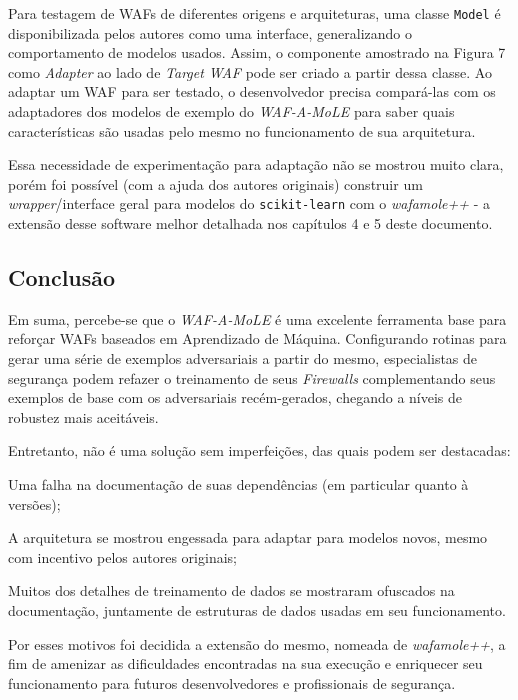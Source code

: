 \bigskip

Para testagem de WAFs de diferentes origens e arquiteturas, uma classe \verb+Model+ é disponibilizada pelos autores como uma interface, generalizando o comportamento de modelos usados. Assim, o componente amostrado na Figura 7 como \textit{Adapter} ao lado de \textit{Target WAF} pode ser criado a partir dessa classe. Ao adaptar um WAF para ser testado, o desenvolvedor precisa compará-las com os adaptadores dos modelos de exemplo do \textit{WAF-A-MoLE} para saber quais características são usadas pelo mesmo no funcionamento de sua arquitetura.


Essa necessidade de experimentação para adaptação não se mostrou muito clara, porém foi possível (com a ajuda dos autores originais) construir um \textit{wrapper}/interface geral para modelos do \verb+scikit-learn+ com o \textit{wafamole++} - a extensão desse software melhor detalhada nos capítulos 4 e 5 deste documento.

\subsection{Conclusão}
Em suma, percebe-se que o \textit{WAF-A-MoLE} é uma excelente ferramenta base para reforçar WAFs baseados em Aprendizado de Máquina. Configurando rotinas para gerar uma série de exemplos adversariais a partir do mesmo, especialistas de segurança podem refazer o treinamento de seus \textit{Firewalls} complementando seus exemplos de base com os adversariais recém-gerados, chegando a níveis de robustez mais aceitáveis. 

Entretanto, não é uma solução sem imperfeições, das quais podem ser destacadas:
\begin{alineas}
\item Uma falha na documentação de suas dependências (em particular quanto à versões);
\item A arquitetura se mostrou engessada para adaptar para modelos novos, mesmo com incentivo pelos autores originais;
\item Muitos dos detalhes de treinamento de dados se mostraram ofuscados na documentação, juntamente de estruturas de dados usadas em seu funcionamento.
\end{alineas}

Por esses motivos foi decidida a extensão do mesmo, nomeada de \textit{wafamole++}, a fim de amenizar as dificuldades encontradas na sua execução e enriquecer seu funcionamento para futuros desenvolvedores e profissionais de segurança.


